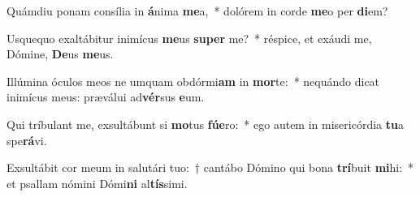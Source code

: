 \item Quámdiu ponam consília in \textbf{á}nima \textbf{me}a,~* dolórem in corde \textbf{me}o per \textbf{di}em?
\item Usquequo exaltábitur inimícus \textbf{me}us \textbf{su}\textbf{per} me?~* réspice, et exáudi me, Dómine, \textbf{De}us \textbf{me}us.
\item Illúmina óculos meos ne umquam obdórmi\textbf{am} in \textbf{mor}te:~* nequándo dicat inimícus meus: præválui ad\textbf{vér}sus \textbf{e}um.
\item Qui tríbulant me, exsultábunt si \textbf{mo}tus \textbf{fú}\textbf{e}ro:~* ego autem in misericórdia \textbf{tu}a spe\textbf{rá}vi.
\item Exsultábit cor meum in salutári tuo:~† cantábo Dómino qui bona \textbf{trí}buit \textbf{mi}hi:~* et psallam nómini Dómi\textbf{ni} al\textbf{tís}simi.
